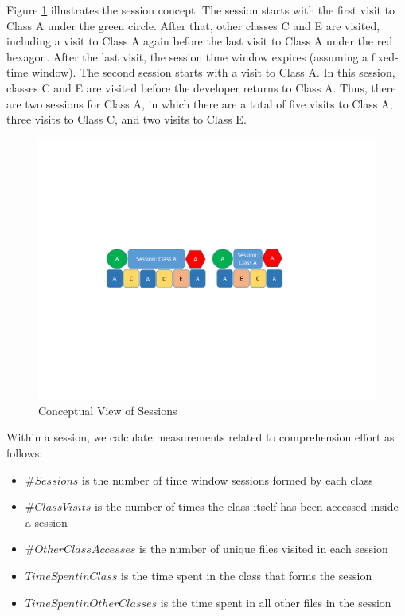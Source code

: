 Figure \ref{fig:SessionDataConcept} illustrates the session concept.  The session starts with the first visit to Class A under the green circle.  After that, other classes C and E are visited, including a visit to Class A again before the last visit to Class A under the red hexagon.  After the last visit, the session time window expires (assuming a fixed-time window).  The second session starts with a visit to Class A.  In this session, classes C and E are visited before the developer returns to Class A.  Thus, there are two sessions for Class A, in which there are a total of five visits to Class A, three visits to Class C, and two visits to Class E.

\begin{figure}
    \centering
    \includegraphics[width=\linewidth]{SessionDataConcept.pdf}
    \caption{Conceptual View of Sessions}
    \label{fig:SessionDataConcept}
\end{figure}


Within a session, we calculate measurements related to comprehension effort as follows:
\begin{itemize}
    \item[] $\# Sessions$ is the number of time window sessions formed by each class 
    \item[] $\# Class Visits$ is the number of times the class itself has been accessed inside a session
    \item[] $\# Other Class Accesses$ is the number of unique files visited in each session
    \item[] $Time Spent in Class$ is the time spent in the class that forms the session
    \item[] $Time Spent in Other Classes$ is the time spent in all other files in the session
\end{itemize}

